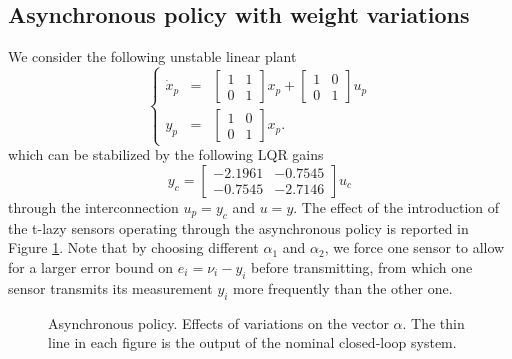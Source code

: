 \documentclass[twocolumn]{autart}
\newcommand{\smallmat}[1]{\left[ \begin{smallmatrix}#1
    \end{smallmatrix} \right]}
\begin{document}
\subsection{Asynchronous policy with weight variations}

We consider the following unstable 
linear plant 
\begin{equation}
\label{plant_example1}
\left\{
\begin{array}{lll}
 \dot{x}_p & = & 
  \smallmat{ 1 & 1 \\ 0 & 1 } x_p + 
  \smallmat{ 1 & 0 \\ 0 & 1 } u_p \\
  y_p & = &\smallmat{ 1 & 0 \\ 0 & 1 }x_p.
\end{array}
\right. 
\end{equation}
which can be stabilized by the following LQR gains
\begin{equation}
\label{controller_example1}
 y_c =  \smallmat{ -2.1961 &  -0.7545 \\  -0.7545 &  -2.7146  } u_c
\end{equation}
through the interconnection $u_p = y_c$ and $u=y$.
The effect of the introduction of the t-lazy sensors operating
through the asynchronous policy is reported in Figure
\ref{figure_example2}.
Note that by choosing different $\alpha_1$ and $\alpha_2$,
we force one sensor to allow for a larger error 
bound on $e_i=\nu_i-y_i$ before transmitting, from which 
one sensor transmits its measurement $y_i$  more frequently than
the other one. 


\begin{figure}[ht!]
\begin{center}
\caption{Asynchronous policy. Effects of variations on the vector $\alpha$.
The thin line in each figure is the output of the nominal closed-loop system.
} 
\label{figure_example2} 
\end{center}
\end{figure} 
\end{document}

